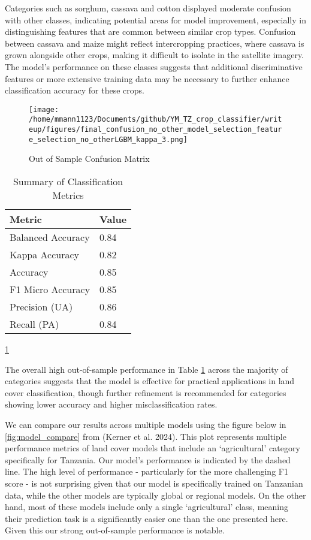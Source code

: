 \documentclass[
  journal,
  twocolumn]{IEEEtran}
\begin{document}
Categories such as sorghum, cassava and cotton displayed moderate
confusion with other classes, indicating potential areas for model
improvement, especially in distinguishing features that are common
between similar crop types. Confusion between cassava and maize might
reflect intercropping practices, where cassava is grown alongside other
crops, making it difficult to isolate in the satellite imagery. The
model's performance on these classes suggests that additional
discriminative features or more extensive training data may be necessary
to further enhance classification accuracy for these crops.

\begin{figure}[H]
    \centering
    \texttt{[image: /home/mmann1123/Documents/github/YM\_TZ\_crop\_classifier/writeup/figures/final\_confusion\_no\_other\_model\_selection\_feature\_selection\_no\_otherLGBM\_kappa\_3.png]} %
    \caption{Out of Sample Confusion Matrix}
    \label{fig:oos_confusion} %
\end{figure}

\begin{table}[h!]
\centering
\begin{tabular}{@{}ll@{}}
\toprule
Metric              & Value                 \\ \midrule
Balanced Accuracy   & 0.84    \\
Kappa Accuracy      & 0.82    \\
Accuracy            & 0.85    \\
F1 Micro Accuracy   & 0.85    \\ 
Precision (UA)   & 0.86    \\ 
Recall (PA)   & 0.84    \\ 
\bottomrule
\end{tabular}
\caption{Summary of Classification Metrics}
\label{tab:metrics}
\ref{tab:metrics}
\end{table}

The overall high out-of-sample performance in Table \ref{tab:metrics}
across the majority of categories suggests that the model is effective
for practical applications in land cover classification, though further
refinement is recommended for categories showing lower accuracy and
higher misclassification rates.

We can compare our results across multiple models using the figure below
in \ref{fig:model_compare} from (Kerner et al. 2024). This plot
represents multiple performance metrics of land cover models that
include an `agricultural' category specifically for Tanzania. Our
model's performance is indicated by the dashed line. The high level of
performance - particularly for the more challenging F1 score - is not
surprising given that our model is specifically trained on Tanzanian
data, while the other models are typically global or regional models. On
the other hand, most of these models include only a single
`agricultural' class, meaning their prediction task is a significantly
easier one than the one presented here. Given this our strong
out-of-sample performance is notable.
\end{document}
